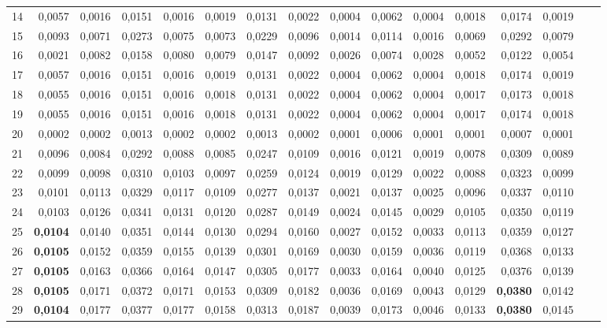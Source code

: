 \begin{table}[htp!]
\begin{adjustwidth}{-1cm}{}
\begin{tabular}{ l | *{15}{| r}}
14	&	0,0057	&	0,0016	&	0,0151	&	0,0016	&	0,0019	&	0,0131	&	0,0022	&	0,0004	&	0,0062	&	0,0004	&	0,0018	&	0,0174	&	0,0019	\\
15	&	0,0093	&	0,0071	&	0,0273	&	0,0075	&	0,0073	&	0,0229	&	0,0096	&	0,0014	&	0,0114	&	0,0016	&	0,0069	&	0,0292	&	0,0079	\\
16	&	0,0021	&	0,0082	&	0,0158	&	0,0080	&	0,0079	&	0,0147	&	0,0092	&	0,0026	&	0,0074	&	0,0028	&	0,0052	&	0,0122	&	0,0054	\\
17	&	0,0057	&	0,0016	&	0,0151	&	0,0016	&	0,0019	&	0,0131	&	0,0022	&	0,0004	&	0,0062	&	0,0004	&	0,0018	&	0,0174	&	0,0019	\\
18	&	0,0055	&	0,0016	&	0,0151	&	0,0016	&	0,0018	&	0,0131	&	0,0022	&	0,0004	&	0,0062	&	0,0004	&	0,0017	&	0,0173	&	0,0018	\\
19	&	0,0055	&	0,0016	&	0,0151	&	0,0016	&	0,0018	&	0,0131	&	0,0022	&	0,0004	&	0,0062	&	0,0004	&	0,0017	&	0,0174	&	0,0018	\\
20	&	0,0002	&	0,0002	&	0,0013	&	0,0002	&	0,0002	&	0,0013	&	0,0002	&	0,0001	&	0,0006	&	0,0001	&	0,0001	&	0,0007	&	0,0001	\\
21	&	0,0096	&	0,0084	&	0,0292	&	0,0088	&	0,0085	&	0,0247	&	0,0109	&	0,0016	&	0,0121	&	0,0019	&	0,0078	&	0,0309	&	0,0089	\\
22	&	0,0099	&	0,0098	&	0,0310	&	0,0103	&	0,0097	&	0,0259	&	0,0124	&	0,0019	&	0,0129	&	0,0022	&	0,0088	&	0,0323	&	0,0099	\\
23	&	0,0101	&	0,0113	&	0,0329	&	0,0117	&	0,0109	&	0,0277	&	0,0137	&	0,0021	&	0,0137	&	0,0025	&	0,0096	&	0,0337	&	0,0110	\\
24	&	0,0103	&	0,0126	&	0,0341	&	0,0131	&	0,0120	&	0,0287	&	0,0149	&	0,0024	&	0,0145	&	0,0029	&	0,0105	&	0,0350	&	0,0119	\\
25	&	\textbf{0,0104}	&	0,0140	&	0,0351	&	0,0144	&	0,0130	&	0,0294	&	0,0160	&	0,0027	&	0,0152	&	0,0033	&	0,0113	&	0,0359	&	0,0127	\\
26	&	\textbf{0,0105}	&	0,0152	&	0,0359	&	0,0155	&	0,0139	&	0,0301	&	0,0169	&	0,0030	&	0,0159	&	0,0036	&	0,0119	&	0,0368	&	0,0133	\\
27	&	\textbf{0,0105}	&	0,0163	&	0,0366	&	0,0164	&	0,0147	&	0,0305	&	0,0177	&	0,0033	&	0,0164	&	0,0040	&	0,0125	&	0,0376	&	0,0139	\\
28	&	\textbf{0,0105}	&	0,0171	&	0,0372	&	0,0171	&	0,0153	&	0,0309	&	0,0182	&	0,0036	&	0,0169	&	0,0043	&	0,0129	&	\textbf{0,0380}	&	0,0142	\\
29	&	\textbf{0,0104}	&	0,0177	&	0,0377	&	0,0177	&	0,0158	&	0,0313	&	0,0187	&	0,0039	&	0,0173	&	0,0046	&	0,0133	&	\textbf{0,0380}	&	0,0145	\\

\end{tabular}
\end{adjustwidth}
\end{table}
